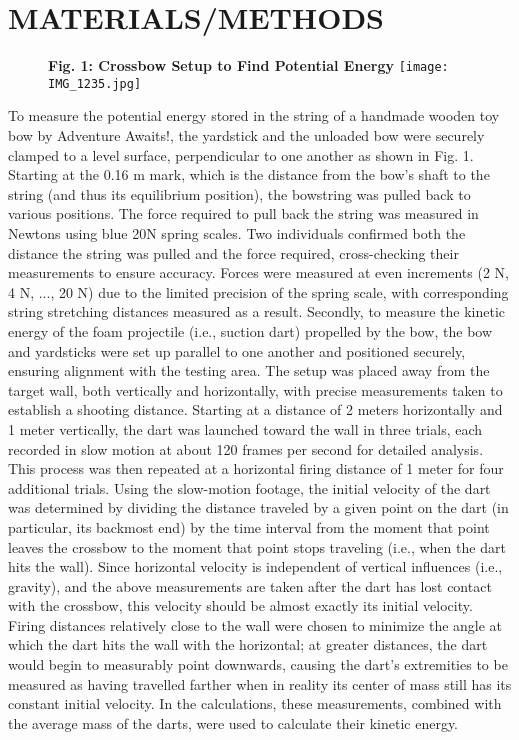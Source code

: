 \documentclass[twocolumn, 10pt]{article}
\begin{document}
 \section*{MATERIALS/METHODS}
 \begin{figure}[h]
    \centering
    \textbf{Fig. 1: Crossbow Setup to Find Potential Energy}
    \texttt{[image: IMG\_1235.jpg]}
\end{figure}
\hspace{\parindent}To measure the potential energy stored in the string of a handmade wooden toy bow by Adventure Awaits!, the yardstick and the unloaded bow were securely clamped to a level surface, perpendicular to one another as shown in Fig. 1. Starting at the 0.16 m mark, which is the distance from the bow's shaft to the string (and thus its equilibrium position), the bowstring was pulled back to various positions. The force required to pull back the string was measured in Newtons using blue 20N spring scales. Two individuals confirmed both the distance the string was pulled and the force required, cross-checking their measurements to ensure accuracy. Forces were measured at even increments (2 N, 4 N, ..., 20 N) due to the limited precision of the spring scale, with corresponding string stretching distances measured as a result. 
Secondly, to measure the kinetic energy of the foam projectile (i.e., suction dart) propelled by the bow, the bow and yardsticks were set up parallel to one another and positioned securely, ensuring alignment with the testing area. The setup was placed away from the target wall, both vertically and horizontally, with precise measurements taken to establish a shooting distance. Starting at a distance of 2 meters horizontally and 1 meter vertically, the dart was launched toward the wall in three trials, each recorded in slow motion at about 120 frames per second for detailed analysis. This process was then repeated at a horizontal firing distance of 1 meter for four additional trials. Using the slow-motion footage, the initial velocity of the dart was determined by dividing the distance traveled by a given point on the dart (in particular, its backmost end) by the time interval from the moment that point leaves the crossbow to the moment that point stops traveling (i.e., when the dart hits the wall). Since horizontal velocity is independent of vertical influences (i.e., gravity), and the above measurements are taken after the dart has lost contact with the crossbow, this velocity should be almost exactly its initial velocity. Firing distances relatively close to the wall were chosen to minimize the angle at which the dart hits the wall with the horizontal; at greater distances, the dart would begin to measurably point downwards, causing the dart’s extremities to be measured as having travelled farther when in reality its center of mass still has its constant initial velocity. In the calculations, these measurements, combined with the average mass of the darts, were used to calculate their kinetic energy.
\end{document}
